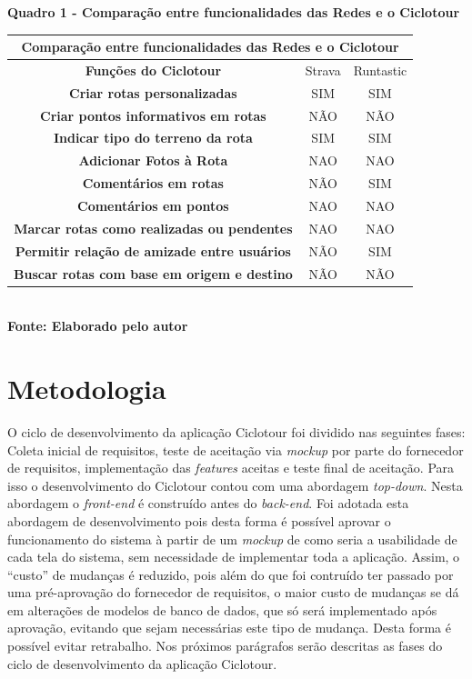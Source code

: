    \begin{center}
          \centering
       	\textbf{Quadro 1 - Comparação entre funcionalidades das Redes e o Ciclotour}\\
        \label{quadro1}
	\begin{tabular}{|c|c|c|} \hline
	\multicolumn{3}{|c|}{\textbf{Comparação entre funcionalidades das Redes e o Ciclotour }} 	  \\
		\hline \textbf{ Funções do Ciclotour } & Strava & Runtastic \\  
		\hline \textbf{ Criar rotas personalizadas } & SIM & SIM \\ 
		\hline \textbf{ Criar pontos informativos em rotas } & NÃO & NÃO  \\
		\hline \textbf{ Indicar tipo do terreno da rota } & SIM & SIM \\ 
		\hline \textbf{	Adicionar Fotos à Rota } & NAO & NAO \\ 
		\hline \textbf{ Comentários em rotas }	& NÃO & SIM \\ 
		\hline \textbf{	Comentários em pontos } & NAO & NAO \\ 
		\hline \textbf{	Marcar rotas como realizadas ou pendentes } & NAO & NAO \\ 
		\hline \textbf{	Permitir relação de amizade entre usuários } & NÃO & SIM \\ 
		\hline \textbf{	Buscar rotas com base em origem e destino } & NÃO & NÃO \\ 
		\hline
	\end{tabular}
	\vspace{0.1cm} 
	{\footnotesize\\ \textbf{Fonte: Elaborado pelo autor}}
   \end{center}

\section{Metodologia}
O ciclo de desenvolvimento da aplicação Ciclotour foi dividido nas seguintes fases: Coleta inicial de requisitos, teste de aceitação via 
\textit{mockup} por parte do fornecedor de requisitos, implementação das \textit{features} aceitas e teste final de aceitação. Para isso 
o desenvolvimento do Ciclotour contou com uma abordagem \textit{top-down}. Nesta abordagem o \textit{front-end} é construído antes do 
\textit{back-end}. Foi adotada esta abordagem de desenvolvimento pois desta forma é possível aprovar o funcionamento do sistema à partir de um 
\textit{mockup} de como seria a usabilidade de cada tela do sistema, sem necessidade de implementar toda a aplicação. Assim, o ``custo'' de mudanças 
é reduzido, pois além do que foi contruído ter passado por uma pré-aprovação do fornecedor de requisitos, o maior custo de mudanças se dá em 
alterações de modelos de banco de dados, que só será implementado após aprovação, evitando que sejam necessárias este tipo de mudança. Desta forma é 
possível evitar retrabalho. Nos próximos parágrafos serão descritas as fases do ciclo de desenvolvimento da aplicação Ciclotour.

